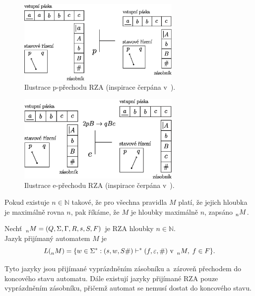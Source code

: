 \begin{figure}[ht]
    \centering
    \includegraphics[width=0.7\textwidth]{obrazky-figures/rza_pop.eps}
    \caption{Ilustrace p-přechodu RZA (inspirace čerpána v~\cite{meduna_rgd_pda}).}
    \label{fig_p-prechod_rza}
\end{figure}

\begin{figure}[ht]
    \centering
    \includegraphics[width=0.7\textwidth]{obrazky-figures/rza_expanze.eps}
    \caption{Ilustrace e-přechodu RZA (inspirace čerpána v~\cite{meduna_rgd_pda}).}
    \label{fig_e-prechod_rza}
\end{figure}

Pokud existuje $n \in \mathbb{N}$ takové, že pro všechna pravidla $M$ platí, že jejich hloubka je maximálně rovna $n$, pak říkáme, že $M$ je hloubky maximálně $n$, zapsáno $\prescript{}{n}{M}$.

\begin{definition}\label{def_jazyk_rza}
    Nechť $\prescript{}{n}{M} = (Q, \Sigma, \Gamma, R, s, S, F)$ je RZA hloubky $n \in \mathbb{N}$. \\
    Jazyk přijímaný automatem $M$ je
    \begin{equation*}
        L(\prescript{}{n}{M}) = \{w \in \Sigma^*: (s, w, S\#) \vdash^* (f, \varepsilon, \#) \text{ v } \prescript{}{n}{M},\; f \in F\}.
    \end{equation*}
\end{definition}

Tyto jazyky jsou přijímané vyprázdněním zásobníku a~zároveň přechodem do koncového stavu automatu.
Dále existují jazyky přijímané RZA pouze vyprázdněním zásobníku, přičemž automat se nemusí dostat do koncového stavu.

